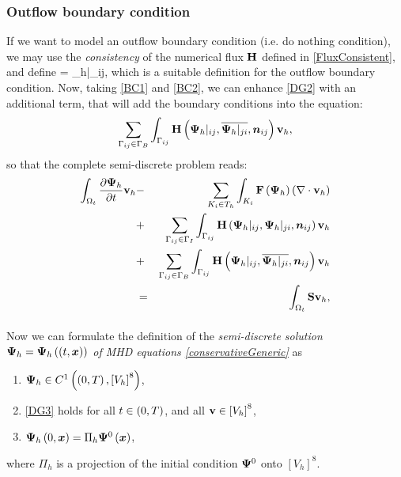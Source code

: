 \subsubsection{Outflow boundary condition}
If we want to model an outflow boundary condition (i.e. do nothing condition), we may use the \textit{consistency} of the numerical flux $\mathrm{\mathbf{H}}$ defined in \ref{FluxConsistent}, and define
\be
\label{BC2}  = {\mrPsi_h}|_{ij},
\ee
which is a suitable definition for the outflow boundary condition.
Now, taking \ref{BC1} and \ref{BC2}, we can enhance \ref{DG2} with an additional term, that will add the boundary conditions into the equation:
$$
\sum_{\Gamma_{ij}\in\Gamma_B} \int_{\Gamma_{ij}} \mathrm{\mathbf{H}}\left({\mathrm{\mathbf{\Psi}}_h}|_{ij}, \overline{{\mathrm{\mathbf{\Psi}}_h}|_{ji}}, \mbox{\boldmath $n$}_{ij}\right) \mathrm{\mathbf{v}}_h,
$$
so that the complete semi-discrete problem reads:
\begin{eqnarray}
\label{DG3} \int_{\Omega_{t}} \frac{\partial{{\mathrm{\mathbf{\Psi}}_h}}}{\partial{t}} \mathrm{\mathbf{v}}_h & - & \sum_{K_i \in T_h}\int_{K_i}\mathrm{\mathbf{F}}\left({\mathrm{\mathbf{\Psi}}_h}\right) \left(\nabla \cdot \mathrm{\mathbf{v}}_h\right)\\ \nonumber & + & \sum_{\Gamma_{ij}\in\Gamma_I} \int_{\Gamma_{ij}} \mathrm{\mathbf{H}}\left({\mathrm{\mathbf{\Psi}}_h}|_{ij}, {\mathrm{\mathbf{\Psi}}_h}|_{ji}, \mbox{\boldmath $n$}_{ij}\right) \mathrm{\mathbf{v}}_h\\\nonumber
 & + & \sum_{\Gamma_{ij}\in\Gamma_B} \int_{\Gamma_{ij}} \mathrm{\mathbf{H}}\left({\mathrm{\mathbf{\Psi}}_h}|_{ij}, \overline{{\mathrm{\mathbf{\Psi}}_h}|_{ji}}, \mbox{\boldmath $n$}_{ij}\right) \mathrm{\mathbf{v}}_h\\\nonumber
 & = & \int_{\Omega_{t}} \mathrm{\mathbf{S}} \mathrm{\mathbf{v}}_h,
\end{eqnarray}

\paragraph{}
Now we can formulate the definition of the \textit{semi-discrete solution ${\mathrm{\mathbf{\Psi}}_h} = {\mathrm{\mathbf{\Psi}}_h}\left((t, \mbox{\boldmath $x$}\right))$ of MHD equations \ref{conservativeGeneric}} as
\begin{enumerate}
    \label{discreteSlnDef}
    \item ${\mathrm{\mathbf{\Psi}}_h} \in C^{1}\left(\left(0, T\right), \left[V_h\right]^8\right)$,
    \item \ref{DG3} holds for all $t\in\left(0, T\right)$, and all $\mathrm{\mathbf{v}}\in \left[V_h\right]^8$,
    \item ${\mathrm{\mathbf{\Psi}}_h}\left(0, \mbox{\boldmath $x$}\right) = \Pi_h \mathrm{\mathbf{\Psi}}^0\left(\mbox{\boldmath $x$}\right)$,
\end{enumerate}
where $\Pi_h$ is a projection of the initial condition $\mathrm{\mathbf{\Psi}}^0$ onto $\left[V_h\right]^8$.


